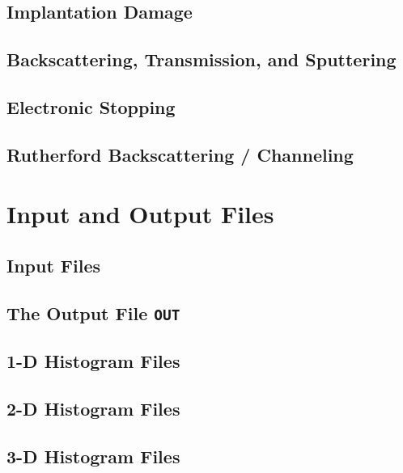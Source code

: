 \documentclass[twoside,12pt]{book}
\begin{document}
\section{Implantation Damage}
\label{s:dam}

%
\section{Backscattering, Transmission, and Sputtering}
\label{s:sput}

%
\section{Electronic Stopping}
\label{s:stop}

%
\section{Rutherford Backscattering / Channeling}
\label{s:RBS}

%
\iffalse
\section{Deterministic damage model}
\label{s:det}

\fi
%
%
\chapter{Input and Output Files}
\label{k:files}

%
\newpage    %
\section{Input Files}
\label{s:input}

%
\newpage
\section{The Output File \texttt{OUT}}
\label{s:out}

%
\newpage
\section{1-D Histogram Files}
\label{s:his1d}

%
\newpage
\section{2-D Histogram Files}
\label{s:his2d}

%
\newpage
\section{3-D Histogram Files}
\label{s:his3d}

%
\newpage
\end{document}
